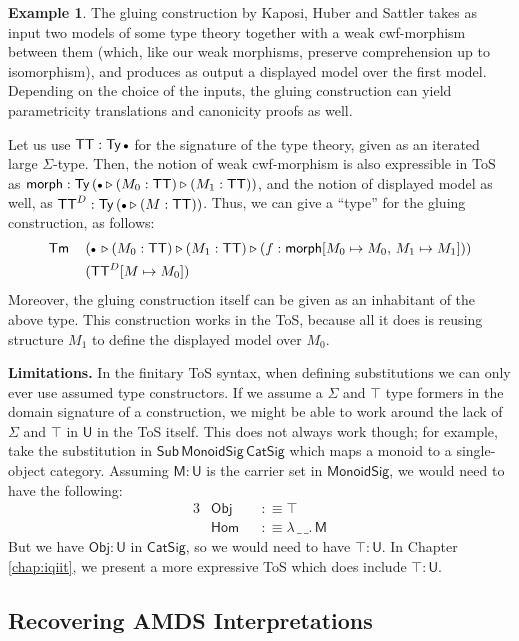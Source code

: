 \documentclass[12pt,a4paper,twoside,openany]{book}
\theoremstyle{remark}
\theoremstyle{definition}
\newtheorem{myexample}{Example}
\theoremstyle{theorem}
\newcommand{\ms}[1]{\mathsf{#1}}
\newcommand{\Sub}{\mathsf{Sub}}
\newcommand{\Tm}{\mathsf{Tm}}
\newcommand{\Ty}{\mathsf{Ty}}
\newcommand{\U}{\mathsf{U}}
\newcommand{\ext}{\triangleright}
\newcommand{\emptycon}{\scaleobj{.75}\bullet}
\newcommand{\Obj}{\ms{Obj}}
\newcommand{\defn}{:\equiv}
\begin{document}
\begin{myexample}
The gluing construction by Kaposi, Huber and Sattler \cite{gluing} takes as
input two models of some type theory together with a weak cwf-morphism between
them (which, like our weak morphisms, preserve comprehension up to isomorphism),
and produces as output a displayed model over the first model. Depending on the
choice of the inputs, the gluing construction can yield parametricity
translations and canonicity proofs as well.

Let us use $\ms{TT} : \Ty\,\emptycon$ for the signature of the type theory,
given as an iterated large $\Sigma$-type. Then, the notion of weak cwf-morphism
is also expressible in ToS as $\ms{morph} : \Ty\,(\emptycon\ext(M_0 :
\ms{TT})\ext(M_1 : \ms{TT}))$, and the notion of displayed model as well, as
$\ms{TT}^D : \Ty\,(\emptycon\ext(M : \ms{TT}))$. Thus, we can give a ``type''
for the gluing construction, as follows:
\begin{alignat*}{3}
  &\Tm\,&&(\emptycon\,\ext (M_0 : \ms{TT}) \ext (M_1 : \ms{TT}) \ext (f : \ms{morph}[M_0 \mapsto M_0,\,M_1 \mapsto M_1]))\\
  & && (\ms{TT}^D[M \mapsto M_0])
\end{alignat*}
Moreover, the gluing construction itself can be given as an inhabitant of the
above type. This construction works in the ToS, because all it does is reusing
structure $M_1$ to define the displayed model over $M_0$.
\end{myexample}

\textbf{Limitations.}
In the finitary ToS syntax, when defining substitutions we can only ever use
assumed type constructors. If we assume a $\Sigma$ and $\top$ type formers in
the domain signature of a construction, we might be able to work around the lack
of $\Sigma$ and $\top$ in $\U$ in the ToS itself. This does not always work
though; for example, take the substitution in
$\Sub\,\ms{MonoidSig}\,\ms{CatSig}$ which maps a monoid to a single-object
category. Assuming $\ms{M} : \U$ is the carrier set in $\ms{MonoidSig}$, we
would need to have the following:
\begin{alignat*}{3}
  &\ms{Obj} &&\defn \top \\
  &\ms{Hom} &&\defn \lambda\,\_\,\_.\, \ms{M}
\end{alignat*}
But we have $\Obj : \U$ in $\ms{CatSig}$, so we would need to have $\top : \U$.
In Chapter \ref{chap:iqiit}, we present a more expressive ToS which does include
$\top : \U$.

\subsection{Recovering AMDS Interpretations}
\end{document}
